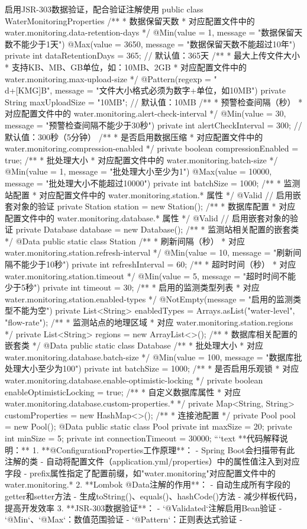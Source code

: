 启用JSR-303数据验证，配合验证注解使用 public class WaterMonitoringProperties { /** * 数据保留天数 * 对应配置文件中的 water.monitoring.data-retention-days */ @Min(value = 1, message = "数据保留天数不能少于1天") @Max(value = 3650, message = "数据保留天数不能超过10年") private int dataRetentionDays = 365; // 默认值：365天 /** * 最大上传文件大小 * 支持KB、MB、GB单位，如：10MB、2GB * 对应配置文件中的 water.monitoring.max-upload-size */ @Pattern(regexp = "\\d+[KMG]B", message = "文件大小格式必须为数字+单位，如10MB") private String maxUploadSize = "10MB"; // 默认值：10MB /** * 预警检查间隔（秒） * 对应配置文件中的 water.monitoring.alert-check-interval */ @Min(value = 30, message = "预警检查间隔不能少于30秒") private int alertCheckInterval = 300; // 默认值：300秒（5分钟） /** * 是否启用数据压缩 * 对应配置文件中的 water.monitoring.compression-enabled */ private boolean compressionEnabled = true; /** * 批处理大小 * 对应配置文件中的 water.monitoring.batch-size */ @Min(value = 1, message = "批处理大小至少为1") @Max(value = 10000, message = "批处理大小不能超过10000") private int batchSize = 1000; /** * 监测站配置 * 对应配置文件中的 water.monitoring.station.* 属性 */ @Valid // 启用嵌套对象的验证 private Station station = new Station(); /** * 数据库配置 * 对应配置文件中的 water.monitoring.database.* 属性 */ @Valid // 启用嵌套对象的验证 private Database database = new Database(); /** * 监测站相关配置的嵌套类 */ @Data public static class Station { /** * 刷新间隔（秒） * 对应 water.monitoring.station.refresh-interval */ @Min(value = 10, message = "刷新间隔不能少于10秒") private int refreshInterval = 60; /** * 超时时间（秒） * 对应 water.monitoring.station.timeout */ @Min(value = 5, message = "超时时间不能少于5秒") private int timeout = 30; /** * 启用的监测类型列表 * 对应 water.monitoring.station.enabled-types */ @NotEmpty(message = "启用的监测类型不能为空") private List<String> enabledTypes = Arrays.asList("water-level", "flow-rate"); /** * 监测站点的地理区域 * 对应 water.monitoring.station.regions */ private List<String> regions = new ArrayList<>(); } /** * 数据库相关配置的嵌套类 */ @Data public static class Database { /** * 批处理大小 * 对应 water.monitoring.database.batch-size */ @Min(value = 100, message = "数据库批处理大小至少为100") private int batchSize = 1000; /** * 是否启用乐观锁 * 对应 water.monitoring.database.enable-optimistic-locking */ private boolean enableOptimisticLocking = true; /** * 自定义数据库属性 * 对应 water.monitoring.database.custom-properties.* */ private Map<String, String> customProperties = new HashMap<>(); /** * 连接池配置 */ private Pool pool = new Pool(); @Data public static class Pool { private int maxSize = 20; private int minSize = 5; private int connectionTimeout = 30000; } } } ```text **代码解释说明：** 1. **@ConfigurationProperties工作原理**： - Spring Boot会扫描带有此注解的类 - 自动将配置文件（application.yml/properties）中的属性值注入到对应字段 - prefix属性指定了配置前缀，如"water.monitoring"对应配置文件中的water.monitoring.* 2. **Lombok @Data注解的作用**： - 自动生成所有字段的getter和setter方法 - 生成toString()、equals()、hashCode()方法 - 减少样板代码，提高开发效率 3. **JSR-303数据验证**： - `@Validated`注解启用Bean验证 - `@Min`、`@Max`：数值范围验证 - `@Pattern`：正则表达式验证 - 